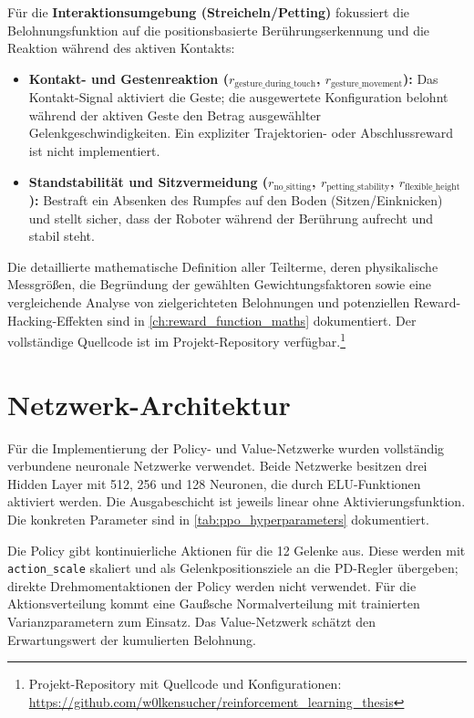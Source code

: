 Für die \textbf{Interaktionsumgebung (Streicheln/Petting)} fokussiert die Belohnungsfunktion auf die positionsbasierte Berührungserkennung und die Reaktion während des aktiven Kontakts:
\begin{itemize}
	\item \textbf{Kontakt- und Gestenreaktion ($r_{\text{gesture\_during\_touch}}$, $r_{\text{gesture\_movement}}$):} Das Kontakt-Signal aktiviert die Geste; die ausgewertete Konfiguration belohnt während der aktiven Geste den Betrag ausgewählter Gelenkgeschwindigkeiten. Ein expliziter Trajektorien- oder Abschlussreward ist nicht implementiert.
	\item \textbf{Standstabilität und Sitzvermeidung ($r_{\text{no\_sitting}}$, $r_{\text{petting\_stability}}$, $r_{\text{flexible\_height}}$):} Bestraft ein Absenken des Rumpfes auf den Boden (Sitzen/Einknicken) und stellt sicher, dass der Roboter während der Berührung aufrecht und stabil steht.
\end{itemize}

Die detaillierte mathematische Definition aller Teilterme, deren physikalische Messgrößen, die Begründung der gewählten Gewichtungsfaktoren sowie eine vergleichende Analyse von zielgerichteten Belohnungen und potenziellen Reward-Hacking-Effekten sind in \autoref{ch:reward_function_maths} dokumentiert. Der vollständige Quellcode ist im Projekt-Repository verfügbar.\footnote{Projekt-Repository mit Quellcode und Konfigurationen: \url{https://github.com/w0lkensucher/reinforcement_learning_thesis}}

\section{Netzwerk-Architektur}

Für die Implementierung der Policy- und Value-Netzwerke wurden vollständig verbundene neuronale Netzwerke verwendet. Beide Netzwerke besitzen drei Hidden Layer mit 512, 256 und 128 Neuronen, die durch ELU-Funktionen aktiviert werden. Die Ausgabeschicht ist jeweils linear ohne Aktivierungsfunktion. Die konkreten Parameter sind in \autoref{tab:ppo_hyperparameters} dokumentiert.

Die Policy gibt kontinuierliche Aktionen für die 12 Gelenke aus. Diese werden mit \texttt{action\_scale} skaliert und als Gelenkpositionsziele an die PD-Regler übergeben; direkte Drehmomentaktionen der Policy werden nicht verwendet. Für die Aktionsverteilung kommt eine Gaußsche Normalverteilung mit trainierten Varianzparametern zum Einsatz. Das Value-Netzwerk schätzt den Erwartungswert der kumulierten Belohnung.

